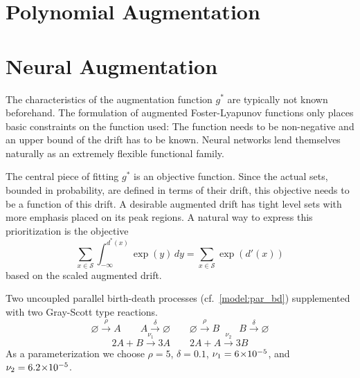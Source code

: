 \section{Polynomial Augmentation}

\section{Neural Augmentation}
The characteristics of the augmentation function $g^*$ are typically not known beforehand.
The formulation of augmented Foster-Lyapunov functions only places basic constraints on the function used:
The function needs to be non-negative and an upper bound of the drift has to be known.
Neural networks lend themselves naturally as an extremely flexible functional family.

The central piece of fitting $g^*$ is an objective function.
Since the actual sets, bounded in probability, are defined in terms of their drift, this objective needs to be a function of this drift.
A desirable augmented drift has tight level sets with more emphasis placed on its peak regions.
A natural way to express this prioritization is the objective
\[\sum_{x\in\mathcal{S}}\int_{-\infty}^{d^*(x)}\exp(y)\,dy = \sum_{x\in\mathcal{S}} \exp(d'(x)) \]
based on the scaled augmented drift.

\begin{model}
	Two uncoupled parallel birth-death processes (cf.~\autoref{model:par_bd}) supplemented with two Gray-Scott type reactions.
$$\varnothing\xrightarrow{\rho} A \qquad A\xrightarrow{\delta} \varnothing \qquad
\varnothing\xrightarrow{\rho} B \qquad B\xrightarrow{\delta} \varnothing$$
$$
	2A+B\xrightarrow{\nu_1}3A\qquad
	2A+A\xrightarrow{\nu_2}3B
$$
	As a parameterization we choose $\rho = 5$, $\delta=0.1$, $\nu_1= 6\!\times\hspace{-.5ex} 10^{-5} $, and $\nu_2= 6.2\!\times\hspace{-.5ex} 10^{-5} $.
\end{model}
